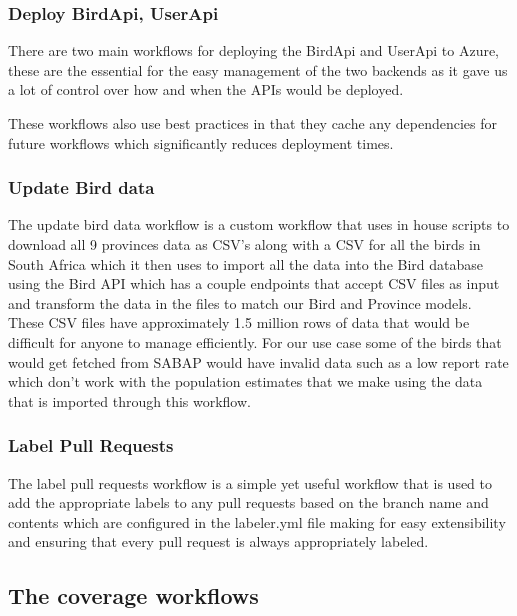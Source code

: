 \documentclass[a4paper]{article}
\begin{document}
\subsubsection{Deploy BirdApi, UserApi}

There are two main workflows for deploying the BirdApi and UserApi to Azure, these are the 
essential for the easy management of the two backends as it gave us a lot of control over 
how and when the APIs would be deployed.
\newline \newline

These workflows also use best practices in that they cache any dependencies for future workflows 
which significantly reduces deployment times.

\subsubsection{Update Bird data}

The update bird data workflow is a custom workflow that uses in house scripts to download 
all 9 provinces data as CSV's along with a CSV for all the birds in South Africa which it 
then uses to import all the data into the Bird database using the Bird API which 
has a couple endpoints that accept CSV files as input and transform the data in the files to match
our Bird and Province models. These CSV files have approximately 1.5 million rows of data 
that would be difficult for anyone to manage efficiently. For our use case some of the 
birds that would get fetched from SABAP would have invalid data such as a low report rate 
which don't work with the population estimates that we make using the data that is imported 
through this workflow. 

\subsubsection{Label Pull Requests}

The label pull requests workflow is a simple yet useful workflow that is used to add the appropriate
labels to any pull requests based on the branch name and contents which are configured 
in the labeler.yml file making for easy extensibility and ensuring that every pull
request is always appropriately labeled. 

\subsection{The coverage workflows}
\end{document}
